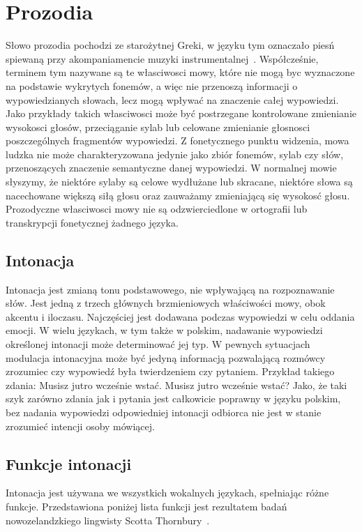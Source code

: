 \documentclass[a4paper,12 pt]{report}
\begin{document}
\section{Prozodia}
Słowo prozodia pochodzi ze starożytnej Greki, w języku tym oznaczało piesń spiewaną przy akompaniamencie muzyki instrumentalnej~\cite{pros}. Współcześnie, terminem tym nazywane są te własciwosci mowy, które nie mogą byc wyznaczone na podstawie wykrytych fonemów, a więc nie przenoszą informacji o wypowiedzianych słowach, lecz mogą wpływać na znaczenie całej wypowiedzi. Jako przykłady takich własciwosci może być postrzegane kontrolowane zmienianie wysokosci głosów, przeciąganie sylab lub celowane zmienianie głosnosci poszczególnych fragmentów wypowiedzi.
Z fonetycznego punktu widzenia, mowa ludzka nie może charakteryzowana jedynie jako zbiór fonemów, sylab czy słów, przenoszących znaczenie semantyczne danej wypowiedzi. W normalnej mowie słyszymy, że niektóre sylaby są celowe wydłużane lub skracane, niektóre słowa są nacechowane większą siłą głosu oraz zauważamy zmieniającą się wysokosć głosu.
Prozodyczne własciwosci mowy nie są odzwierciedlone w ortografii lub transkrypcji fonetycznej żadnego języka.
\subsection{Intonacja}
Intonacja jest zmianą tonu podstawowego, nie wpływającą na rozpoznawanie słów. Jest jedną z trzech głównych brzmieniowych właściwości mowy, obok akcentu i iloczasu. Najczęściej jest dodawana podczas wypowiedzi w celu oddania emocji. W wielu językach, w tym także w polskim, nadawanie wypowiedzi określonej intonacji może determinować jej typ. W pewnych sytuacjach modulacja intonacyjna może być jedyną informacją pozwalającą rozmówcy zrozumiec czy wypowiedź była twierdzeniem czy pytaniem. 
Przykład takiego zdania:
\newline Musisz jutro wcześnie wstać.
\newline Musisz jutro wcześnie wstać?
\newline Jako, że taki szyk zarówno zdania jak i pytania jest całkowicie poprawny w języku polskim, bez nadania wypowiedzi odpowiedniej intonacji odbiorca nie jest w stanie zrozumieć intencji osoby mówiącej.
\subsection{Funkcje intonacji}
Intonacja jest używana we wszystkich wokalnych językach, spełniając różne funkcje. 
Przedstawiona poniżej lista funkcji jest rezultatem badań nowozelandzkiego lingwisty Scotta Thornbury~\cite{TS}.
\end{document}
